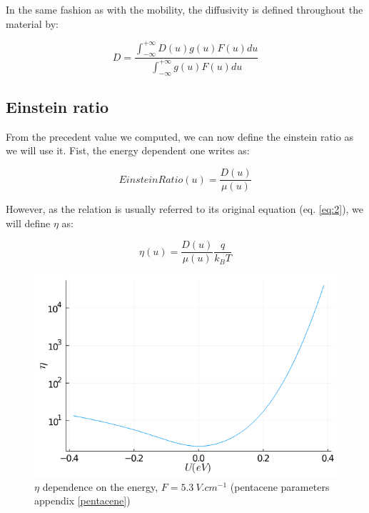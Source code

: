 In the same fashion as with the mobility, the diffusivity is defined throughout the material by:

\begin{equation}
    D = \frac{\int_{-\infty}^{+\infty}D(u)g(u)F(u)du}{\int_{-\infty}^{+\infty}g(u)F(u)du}
    \label{eq:3_12}
\end{equation}

\subsection{Einstein ratio}

From the precedent value we computed, we can now define the einstein ratio as we will use it. Fist, the energy dependent one writes as:

\begin{equation}
    EinsteinRatio(u) = \frac{D(u)}{\mu(u)}
    \label{eq:3_13}
\end{equation}

However, as the relation is usually referred to its original equation (eq. \ref{eq:2}), we will define $\eta$ as:

\begin{equation}
    \eta(u) = \frac{D(u)}{\mu(u)} \frac{q}{k_BT}
    \label{eq:3_14}
\end{equation}

\begin{figure}[!h]
    \centering
    \includegraphics*[width=.5\paperwidth]{figures/3_elec/ein_u.png}
    \caption{$\eta$ dependence on the energy, $F = \SI{5.3}{V . cm^{-1}}$ (pentacene parameters appendix \ref{pentacene})\label{fig:3_12}}
\end{figure}


